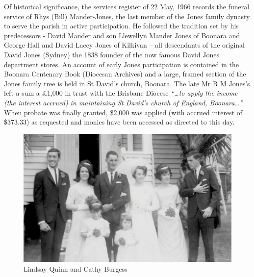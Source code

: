 Of historical significance, the services register of 22 May, 1966 records the funeral service of Rhys (Bill) Mander-Jones, the last member of the Jones family dynasty to serve the parish in active participation. He followed the tradition set by his predecessors - David Mander and son Llewellyn Mander Jones of Boonara and George Hall and David Lacey Jones of Kilkivan -- all descendants of the original David Jones (Sydney) the 1838 founder of the now famous David Jones department stores. An account of early Jones participation is contained in the Boonara Centenary Book (Diocesan Archives) and a large, framed section of the Jones family tree is held in St David's church, Boonara. The late Mr R M Jones's left a sum a \pounds1,000 in trust with the Brisbane Diocese \emph{``\ldots to apply the income (the interest accrued) in maintaining St David's church of England, Boonara\ldots''.} When probate was finally granted, \$2,000 was applied (with accrued interest of \$373.33) as requested and monies have been accessed as directed to this day.









\begin{figure}[!htb]
\begin{center}
\includegraphics[width=1.\textwidth,center]{../images/LindsayQuinnCathyBurgessWedding.jpg}
\caption{Lindsay Quinn and Cathy Burgess}
\end{center}
\end{figure}




